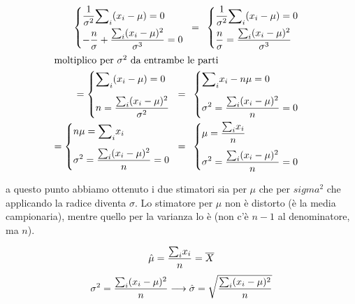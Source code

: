 \begin{esempio}
\begin{align*}
    \begin{cases}
        \displaystyle \frac{1}{\sigma^2} {\sum}_i (x_i - \mu) = 0 \\[5pt] 
        \displaystyle-\frac{n}{\sigma} + \frac{{\sum}_i(x_i - \mu)^2}{\sigma^3} = 0
    \end{cases} \hspace{-5pt} = \hspace{5pt} 
    \begin{cases}
        \displaystyle\frac{1}{\sigma^2} {\sum}_i (x_i - \mu) = 0 \\[5pt]
        \displaystyle\frac{n}{\sigma} = \frac{{\sum}_i(x_i - \mu)^2}{\sigma^3}
    \end{cases} \\ 
    \intertext{moltiplico per $\sigma^2$ da entrambe le parti}
    =
    \begin{cases}
        \displaystyle {\sum}_i (x_i - \mu) = 0 \\[10pt]
        \displaystyle n = \frac{{\sum}_i(x_i - \mu)^2}{\sigma^2}
    \end{cases} \hspace{-5pt} = \hspace{5pt} 
    \begin{cases}
        \displaystyle {\sum}_i x_i - n\mu = 0 \\[10pt]
        \displaystyle \sigma^2 = \frac{{\sum}_i(x_i - \mu)^2}{n} = 0
    \end{cases} \\
    =
    \begin{cases}
        \displaystyle n\mu = {\sum}_i x_i \\[10pt]
        \displaystyle \sigma^2 = \frac{{\sum}_i(x_i - \mu)^2}{n} = 0
    \end{cases} \hspace{-5pt} = \hspace{5pt} 
    \begin{cases}
        \displaystyle \mu = \frac{{\sum}_i x_i}{n}\\[10pt]
        \displaystyle \sigma^2 = \frac{{\sum}_i(x_i - \mu)^2}{n} = 0
    \end{cases}
\end{align*}

\noindent a questo punto abbiamo ottenuto i due stimatori sia per $\mu$ che per $sigma^2$ che applicando la radice diventa $\sigma$. Lo stimatore per $\mu$ non è distorto (è la media campionaria), mentre quello per la varianza lo è (non c'è $n -1$ al denominatore, ma $n$).

$$\hat{\mu} = \frac{{\sum}_i x_i}{n} = \overline{X}$$
$$\sigma^2 = \frac{{\sum}_i(x_i - \mu)^2}{n} \longrightarrow \hat{\sigma} = \sqrt{\frac{{\sum}_i(x_i - \mu)^2}{n}}$$

\end{esempio}

